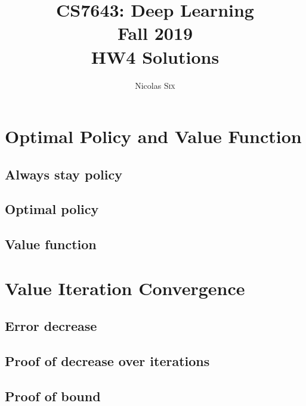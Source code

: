 \documentclass[11pt,english]{article}
\begin{document}
    \title{CS7643: Deep Learning \\
    Fall 2019\\ HW4 Solutions}
    \author{Nicolas \textsc{Six}}
    \maketitle



    \section{Optimal Policy and Value Function}
    \subsection{Always stay policy}
    

    \pagebreak
    \subsection{Optimal policy}
    

    \pagebreak
    \subsection{Value function}
    

    \pagebreak
    \section{Value Iteration Convergence}
    \subsection{Error decrease}
    

    \pagebreak
    \subsection{Proof of decrease over iterations}
    

    \pagebreak
    \subsection{Proof of bound}
    
\end{document}
